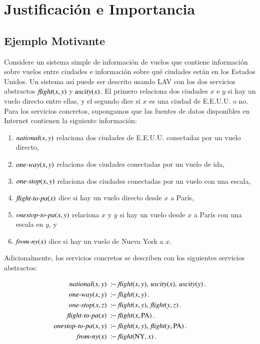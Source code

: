 \section{Justificación e Importancia}

\subsection{Ejemplo Motivante}

\newcommand{\flight}{\text{\it flight}}
\newcommand{\UScity}{\text{\it uscity}}
\newcommand{\national}{\text{\it national}}
\newcommand{\oneway}{\text{\it one-way}}
\newcommand{\onestop}{\text{\it one-stop}}
\newcommand{\flightPA}{\text{\it flight-to-pa}}
\newcommand{\onestopPA}{\text{\it onestop-to-pa}}
\newcommand{\fromNY}{\text{\it from-ny}}
\newcommand{\PA}{\text{PA}}
\newcommand{\NY}{\text{NY}}
\newcommand{\AL}{\text{AL}}

Considere un sistema simple de información de vuelos que contiene información
sobre vuelos entre ciudades e información sobre qué ciudades están en los
Estados Unidos. Un sistema así puede ser descrito usando LAV con los dos servicios
abstractos $\flight(x,y)$ y $\UScity(x)$. El primero relaciona dos ciudades $x$ e $y$ si
hay un vuelo directo entre ellas, y el segundo dice si $x$ es una ciudad de
E.E.U.U.  o no. Para los servicios concretos, supongamos que las fuentes de
datos disponibles en Internet contienen la siguiente información:

\begin{enumerate}[--]
\item $\national(x,y)$ relaciona dos ciudades de E.E.U.U. conectadas por un vuelo directo,
\item $\oneway(x,y)$ relaciona dos ciudades conectadas por un vuelo de ida,
\item $\onestop(x,y)$ relaciona dos ciudades conectadas por un vuelo con una escala,
\item $\flightPA(x)$ dice si hay un vuelo directo desde $x$ a París,
\item $\onestopPA(x,y)$ relaciona $x$ y $y$ si hay un vuelo desde $x$ a París con una escala en $y$, y
\item $\fromNY(x)$ dice si hay un vuelo de Nueva York a $x$.
\end{enumerate}

Adicionalmente, los servicios concretos se describen con los siguientes
servicios abstractos:

\begin{alignat*}{1}
\national(x,y)\   &\qrule\ \flight(x,y),\,\UScity(x),\,\UScity(y)\,. \\
\oneway(x,y)\     &\qrule\ \flight(x,y)\,. \\
\onestop(x,z)\    &\qrule\ \flight(x,y),\,\flight(y,z)\,. \\
\flightPA(x)\     &\qrule\ \flight(x,\PA)\,. \\
\onestopPA(x,y)\  &\qrule\ \flight(x,y),\,\flight(y,\PA)\,. \\
\fromNY(x)\       &\qrule\ \flight(\NY,x)\,.
\end{alignat*}

